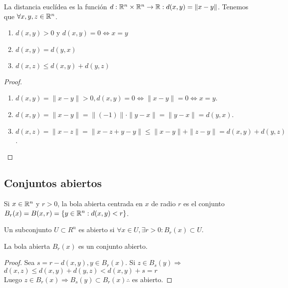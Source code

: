 \begin{definition}
  La distancia euclídea es la función \(d: \mathbb{R}^n \times \mathbb{R}^n \to \mathbb{R} : d(x, y) = \|x-y\|\).
  Tenemos que \(\forall x,y,z \in \mathbb{R}^n\).
  \begin{enumerate}
    \item \(d(x, y) > 0\) y \(d(x, y) = 0 \iff x=y\)
    \item \(d(x, y) = d(y, x)\)
    \item \(d(x, z) \leq d(x, y) + d(y, z)\)
  \end{enumerate}
  \begin{proof}
    \begin{enumerate}
      \item \(d(x, y) = \|x-y\| > 0, d(x, y) = 0 \iff \|x-y\| = 0 \iff x = y\).
      \item \(d(x, y) = \|x-y\| = \|(-1)\| \cdot \|y-x\| = \|y-x\| = d(y, x)\).
      \item \(d(x, z) = \|x-z\| = \|x-z+y-y\| \leq \|x-y\| + \|z-y\| = d(x, y) + d(y, z)\).
    \end{enumerate}
  \end{proof}
\end{definition}

\subsection{Conjuntos abiertos}
\begin{definition}
  Si \(x \in \mathbb{R}^n\) y \(r > 0\), la bola abierta centrada en \(x\) de radio \(r\) es el conjunto \(B_r(x) = B(x,r) = \{ y \in \mathbb{R}^n : d(x, y) < r \}\).
\end{definition}

\begin{definition}
  Un subconjunto \(U \subset R^n\) es abierto si \(\forall x \in U, \exists r > 0 : B_r(x) \subset U\).
\end{definition}

\begin{lemma}
  La bola abierta \(B_r(x)\) es un conjunto abierto.
  \begin{proof}
    Sea \(s = r - d(x, y), y \in B_r(x)\). Si \(z \in B_s(y) \Rightarrow\) \\
    \(d(x, z) \leq d(x, y) + d(y, z) < d(x, y) + s = r\) \\
    Luego \(z \in B_r(x) \Rightarrow B_s(y) \subset B_r(x) \therefore\) es abierto.
  \end{proof}
\end{lemma}

